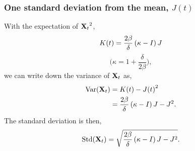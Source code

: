 \subsubsection{One standard deviation from the mean, $J(t)$}
With the expectation of ${{\bf X}_t}^2$,
\begin{equation*}
K(t) = \frac{2\beta}{\delta}\left(\kappa- I\right) J
\end{equation*}
$$\bigg( \kappa = 1+\frac{\delta}{2\beta}\bigg),$$
we can write down the variance of ${{\bf X}_t}$ as,
\begin{align*}
\text{Var}({{\bf X}_t}) &= K(t) - {J(t)}^2\\
&= \frac{2\beta}{\delta}\left(\kappa - I\right) J - J^2.
\end{align*}
The standard deviation is then,
\begin{equation*}
\text{Std}({{\bf X}_t}) = \sqrt{\frac{2\beta}{\delta}\left(\kappa- I\right) J - J^2}.
\end{equation*}
